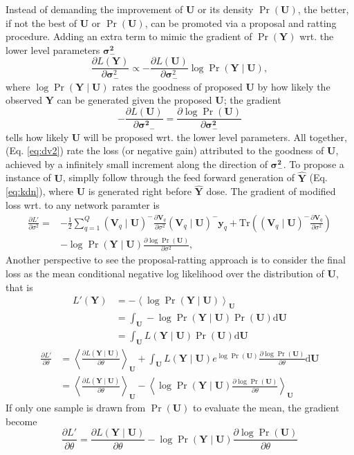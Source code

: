 \documentclass[11pt]{article}
\def\style{apa}
\newcommand{\bs}{\boldsymbol}
\newcommand{\mean}[2]{\left\langle{#1}\right\rangle_{#2}}
\newcommand{\trb}[1]{\textrm{Tr}\left({#1}\right)}
\newcommand{\invb}[1]{{\left({#1}\right)^-}}
\newcommand{\vy}{\boldsymbol{y}}
\newcommand{\xv}{\boldsymbol{V}}
\newcommand{\xu}{\boldsymbol{U}}
\newcommand{\xy}{\boldsymbol{Y}}
\newcommand{\xyh}{\hat{\xy}}
\newcommand{\PDV}[2]{\frac{\partial #1}{\partial #2}}
\begin{document}
Instead of demanding the improvement of $\xu$ or its density $\Pr(\xu)$, the better, if not the best of $\xu$ or $\Pr(\xu)$, can be promoted via a proposal and ratting procedure. Adding an extra term to mimic the gradient of $\Pr(\xy)$ wrt. the lower level parameters $\bs{\sigma^2_-}$
\begin{equation}\label{eq:dv2}
  \PDV{L(\xy)}{\bs{\sigma}^2_-} \propto -\PDV{L(\xu)}{\bs{\sigma}^2_-} \log{\Pr(\xy \mid \xu)},
\end{equation}
where $\log\Pr(\xy \mid \xu)$ rates the goodness of proposed $\xu$ by how likely the observed $\xy$ can be generated given the proposed $\xu$; the gradient
\begin{equation*}
  -\PDV{L(\xu)}{\bs{\sigma^2}_-} = \PDV{\log\Pr(\xu)}{\bs{\sigma^2_-}}
\end{equation*}
tells how likely $\xu$ will be proposed wrt. the lower level parameters. All together, (Eq. \ref{eq:dv2}) rate the loss (or negative gain) attributed to the goodness of $\xu$, achieved by a infinitely small increment along the direction of $\bs{\sigma^2_-}$. To propose a instance of $\xu$, simplly follow through the feed forward generation of $\xyh$ (Eq. \ref{eq:kdn}), where $\xu$ is generated right before $\xyh$ dose. The gradient of modified loss wrt. to any network paramter is
\begin{equation} \label{eq:ls2}
  \begin{split}
    \PDV{L'}{\sigma^2} =
    &-\frac{1}{2} \sum_{q=1}^Q \invb{\xv_q\mid\xu} \PDV{\xv_q}{\sigma^2} \invb{\xv_q\mid\xu} \vy_q + \trb{\invb{\xv_q\mid\xu}\PDV{\xv_q}{\sigma^2}} \\
    &-\log \Pr(\xy \mid \xu) \PDV{\log \Pr(\xu)}{\sigma^2},
  \end{split}
\end{equation}
Another perspective to see the proposal-ratting approach is to consider the final loss as the mean conditional negative log likelihood over the distribution of $\xu$, that is
\begin{equation}\label{eq:ls3}
  \begin{split}
    L'(\xy)
    &= -\mean{\log\Pr(\xy\mid\xu)}{\xu} \\
    &= \int_{\xu} -\log\Pr(\xy\mid\xu) \Pr(\xu)\textrm{d}\xu \\
    &= \int_{\xu} L(\xy\mid\xu) \Pr(\xu) \textrm{d}\xu
  \end{split}
\end{equation}
\begin{equation}\label{eq:dv3}
  \begin{split}
    \PDV{L'}{\theta}
    &= \mean{\PDV{L(\xy\mid\xu)}{\theta}}{\xu} + \int_{\xu} L(\xy\mid\xu) e^{\log\Pr(\xu)}\PDV{\log\Pr(\xu)}{\theta}\textrm{d}\xu \\
    &= \mean{\PDV{L(\xy\mid\xu)}{\theta}}{\xu} - \mean{\log\Pr(\xy\mid\xu)\PDV{\log\Pr(\xu)}{\theta}}{\xu}
  \end{split}
\end{equation}
If only one sample is drawn from $\Pr(\xu)$ to evaluate the mean, the gradient become
\begin{equation*}
    \PDV{L'}{\theta} = \PDV{L(\xy\mid\xu)}{\theta} - \log\Pr(\xy\mid\xu)\PDV{\log\Pr(\xu)}{\theta}
\end{equation*}
\singlespacing 


\end{document}
